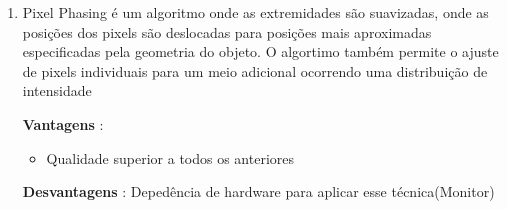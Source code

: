 \begin{enumerate}[label=\alph*.]
					\item Pixel Phasing é um algoritmo onde as extremidades são suavizadas, onde as posições dos pixels são deslocadas para posições mais aproximadas especificadas pela geometria do objeto. O algortimo também  permite  o  ajuste  de  pixels  individuais 
para  um meio  adicional  ocorrendo  uma  distribuição  de  intensidade
					
					\textbf{Vantagens} :  \begin{itemize}
						\item Qualidade superior a todos os anteriores
					\end{itemize}
					
					\textbf{Desvantagens} : Depedência de hardware para aplicar esse técnica(Monitor)
									
 			  \end{enumerate}
 			  